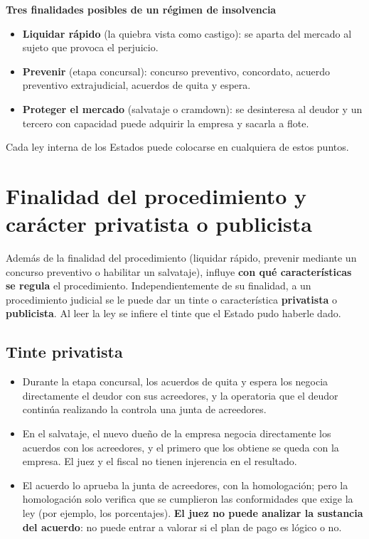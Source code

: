 \documentclass[12pt,oneside]{book}
\begin{document}
\begin{important}
\textbf{Tres finalidades posibles de un régimen de insolvencia}
\begin{itemize}
    \item \textbf{Liquidar rápido} (la quiebra vista como castigo): se aparta del mercado al sujeto que provoca el perjuicio.
    \item \textbf{Prevenir} (etapa concursal): concurso preventivo, concordato, acuerdo preventivo extrajudicial, acuerdos de quita y espera.
    \item \textbf{Proteger el mercado} (salvataje o cramdown): se desinteresa al deudor y un tercero con capacidad puede adquirir la empresa y sacarla a flote.
\end{itemize}
Cada ley interna de los Estados puede colocarse en cualquiera de estos puntos.
\end{important}

\section{Finalidad del procedimiento y carácter privatista o publicista}

Además de la finalidad del procedimiento (liquidar rápido, prevenir mediante un concurso preventivo o habilitar un salvataje), influye \textbf{con qué características se regula} el procedimiento. Independientemente de su finalidad, a un procedimiento judicial se le puede dar un tinte o característica \textbf{privatista} o \textbf{publicista}. Al leer la ley se infiere el tinte que el Estado pudo haberle dado.

\subsection{Tinte privatista}

\begin{itemize}
    \item Durante la etapa concursal, los acuerdos de quita y espera los negocia directamente el deudor con sus acreedores, y la operatoria que el deudor continúa realizando la controla una junta de acreedores.
    \item En el salvataje, el nuevo dueño de la empresa negocia directamente los acuerdos con los acreedores, y el primero que los obtiene se queda con la empresa. El juez y el fiscal no tienen injerencia en el resultado.
    \item El acuerdo lo aprueba la junta de acreedores, con la homologación; pero la homologación solo verifica que se cumplieron las conformidades que exige la ley (por ejemplo, los porcentajes). \textbf{El juez no puede analizar la sustancia del acuerdo}: no puede entrar a valorar si el plan de pago es lógico o no.
\end{itemize}
\end{document}

